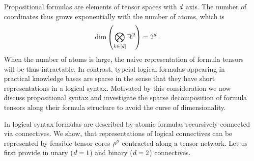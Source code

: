 
Propositional formulas are elements of tensor spaces with $d$ axis. 
The number of coordinates thus grows exponentially with the number of atoms, which is
	\[ \mathrm{dim}\left(\bigotimes_{k\in[d]}\mathbb{R}^2\right) = 2^{d} \, . \]
When the number of atoms is large, the naive representation of formula tensors will be thus intractable.
In contrast, typcial logical formulas appearing in practical knowledge bases are sparse in the sense that they have short representations in a logical syntax.
Motivated by this consideration we now discuss propositional syntax and investigate the sparse decomposition of formula tensors along their formula structure to avoid the curse of dimensionality.

In logical syntax formulas are described by atomic formulas recursively connected via connectives. 
We show, that representations of logical connectives can be represented by feasible tensor cores $\rho^{\circ}$ contracted along a tensor network.
Let us first provide in  unary ($d=1$) and binary ($d=2$) connectives.

